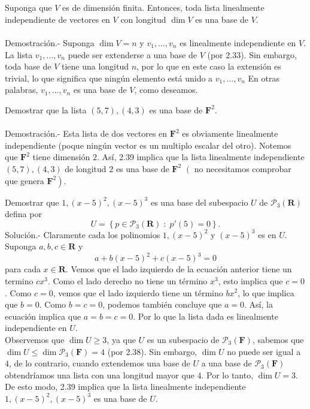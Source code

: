 \begin{myteo}\,\\\\
    Suponga que $V$ es de dimensión finita. Entonces, toda lista linealmente independiente de vectores en $V$ con longitud $\dim V$ es una base de $V$.\\\\
	Demostración.-\; Suponga $\dim V=n$ y $v_1,\ldots,v_n$ es linealmente independiente en $V$. La lista $v_1,\ldots,v_n$ puede ser extenderse a una base de $V$ (por 2.33). Sin embargo, toda base de $V$ tiene una longitud $n$, por lo que en este caso la extensión es trivial, lo que significa que ningún elemento está unido a $v_1,\ldots, v_n$ En otras palabras, $v_1,\ldots, v_n$ es una base de $V$, como deseamos.
\end{myteo}

\begin{myejem}
    Demostrar que la lista $(5,7),(4,3)$ es una base de $\textbf{F}^2$.\\\\
	Demostración.-\; Esta lista de dos vectores en $\textbf{F}^2$ es obviamente linealmente independiente (poque ningún vector es un multiplo escalar del otro). Notemos que $\textbf{F}^2$ tiene dimensión $2$. Así, 2.39 implica que la lista linealmente independiente $(5,7),(4,3)$ de longitud $2$ es una base de $\textbf{F}^2$ $\left(\right.$ no necesitamos comprobar que genera $\left.\textbf{F}^2\right)$. 
\end{myejem}

\begin{myejem}
    Demostrar que $1,(x-5)^2,(x-5)^3$ es una base del subespacio $U$ de $\mathcal{P}_3(\textbf{R})$ defina por
    $$U=\left\{p\in \mathcal{P}_3(\textbf{R})\; : \; p'(5)=0\right\}.$$
	Solución.-\; Claramente cada los polinomios $1,(x-5)^2$ y $(x-5)^3$ es en $U$. Suponga $a,b,c \in \textbf{R}$ y 
	$$a+b(x-5)^2+c(x-5)^3=0$$
	para cada $x\in \textbf{R}.$ Vemos que el lado izquierdo de la ecuación anterior tiene un termino $cx^3$. Como el lado derecho no tiene un término $x^3$, esto implica que $c = 0$. Como $c = 0$, vemos que el lado izquierdo tiene un término $bx^2$, lo que implica que $b = 0$. Como $b = c = 0$, podemos también concluye que $a = 0$. Así, la ecuación implica que $a=b=c=0$. Por lo que la lista dada es linealmente independiente en $U$.\\

	Observemos que $\dim U\geq 3$, ya que $U$ es un subespacio de $\mathcal{P}_3(\textbf{F})$, sabemos que $\dim U \leq \dim \mathcal{P}_3(\textbf{F})=4$ (por 2.38). Sin embargo, $\dim U$ no puede ser igual a $4$, de lo contrario, cuando extendemos una base de $U$ a una base de $\mathcal{P}_3(\textbf{F})$ obtendríamos una lista con una longitud mayor que $4$. Por lo tanto, $\dim U = 3$. De esto modo, 2.39 implica que la lista linealmente independiente $1,(x-5)^2,(x-5)^3$ es una base de $U$.
\end{myejem}

